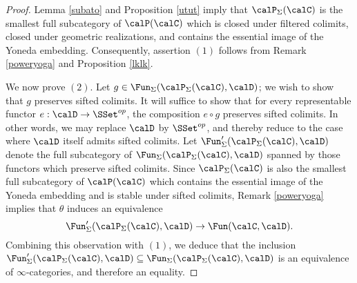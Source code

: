 \begin{proof}
Lemma \ref{subato} and Proposition \ref{utut} imply that $\calP_{\Sigma}(\calC)$ is the smallest full subcategory of $\calP(\calC)$ which is closed under filtered colimits, closed under geometric realizations, and contains the essential image of the Yoneda embedding. Consequently, assertion $(1)$ follows from Remark \ref{poweryoga} and Proposition \ref{lklk}. 

We now prove $(2)$. Let $g \in \Fun_{\Sigma}( \calP_{\Sigma}(\calC), \calD)$; we wish to show that $g$ preserves sifted colimits. It will suffice to show that for every representable functor
$e: \calD \rightarrow \SSet^{op}$, the composition $e \circ g$ preserves sifted colimits. In other words, we may replace $\calD$ by $\SSet^{op}$, and thereby reduce to the case where
$\calD$ itself admits sifted colimits. Let $\Fun'_{\Sigma}( \calP_{\Sigma}(\calC), \calD)$ denote the full subcategory of $\Fun_{\Sigma}( \calP_{\Sigma}(\calC), \calD)$ spanned by those functors which preserve sifted colimits. Since $\calP_{\Sigma}(\calC)$ is also the smallest full subcategory of $\calP(\calC)$ which contains the essential image of the Yoneda embedding and is stable under sifted colimits, Remark \ref{poweryoga} implies that $\theta$ induces an equivalence
$$ \Fun'_{\Sigma}( \calP_{\Sigma}(\calC), \calD ) \rightarrow \Fun(\calC, \calD).$$
Combining this observation with $(1)$, we deduce that the inclusion
$\Fun'_{\Sigma}( \calP_{\Sigma}(\calC), \calD) \subseteq \Fun_{\Sigma}( \calP_{\Sigma}(\calC), \calD)$
is an equivalence of $\infty$-categories, and therefore an equality.


\end{proof}
